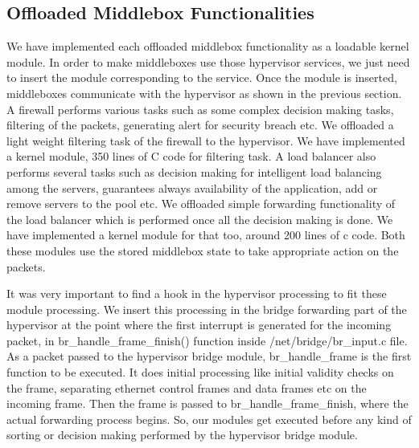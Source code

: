 \documentclass[a4paper,11pt]{report}
\begin{document}
\subsection{Offloaded Middlebox Functionalities}
We have implemented each offloaded middlebox functionality as a loadable kernel module. In order to make middleboxes use those hypervisor services, we just need to insert the module corresponding to the service. Once the module is inserted, middleboxes communicate with the hypervisor as shown in the previous section. A firewall performs various tasks such as some complex decision making tasks, filtering of the packets, generating alert for security breach etc. We offloaded a light weight filtering task of the firewall to the hypervisor. We have implemented a kernel module, 350 lines of C code for filtering task. A load balancer also performs several tasks such as decision making for intelligent load balancing among the servers, guarantees always availability of the application, add or remove servers to the pool etc. We offloaded simple forwarding functionality of the load balancer which is performed once all the decision making is done. We have implemented a kernel module for that too, around 200 lines of c code. Both these modules use the stored middlebox state to take appropriate action on the packets.

It was very important to find a hook in the hypervisor processing to fit these module processing. We insert this processing in the bridge forwarding part of the hypervisor at the point where the first interrupt is generated for the incoming packet, in br\_handle\_frame\_finish() function inside /net/bridge/br\_input.c file. As a packet passed to the hypervisor bridge module, br\_handle\_frame is the first function to be executed. It does initial processing like initial validity checks on the frame, separating ethernet control frames and data frames etc on the incoming frame. Then the frame is passed to br\_handle\_frame\_finish, where the actual forwarding process begins. So, our modules get executed before any kind of sorting or decision making performed by the hypervisor bridge module.                          
\end{document}
